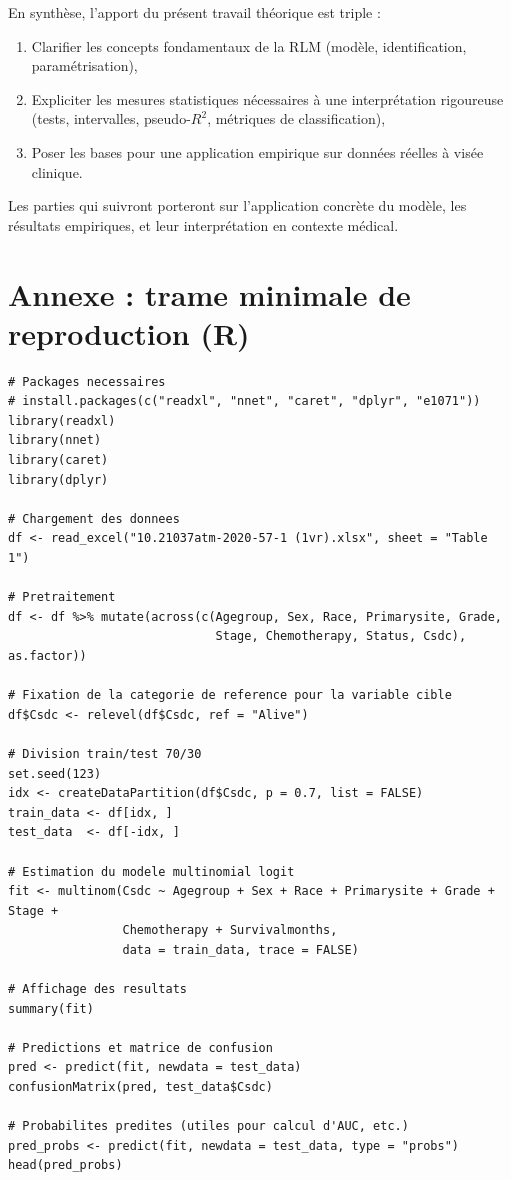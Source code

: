 \documentclass[12pt,a4paper]{article}
\begin{document}
En synthèse, l'apport du présent travail théorique est triple :
\begin{enumerate}[label=\arabic*.]
    \item Clarifier les concepts fondamentaux de la RLM (modèle, identification, paramétrisation),
    \item Expliciter les mesures statistiques nécessaires à une interprétation rigoureuse (tests, intervalles, pseudo-$R^2$, métriques de classification),
    \item Poser les bases pour une application empirique sur données réelles à visée clinique.
\end{enumerate}

Les parties qui suivront porteront sur l'application concrète du modèle, les résultats empiriques, et leur interprétation en contexte médical.

\section*{Annexe : trame minimale de reproduction (R)}

\begin{verbatim}
# Packages necessaires
# install.packages(c("readxl", "nnet", "caret", "dplyr", "e1071"))
library(readxl)
library(nnet)
library(caret)
library(dplyr)

# Chargement des donnees
df <- read_excel("10.21037atm-2020-57-1 (1vr).xlsx", sheet = "Table 1")

# Pretraitement
df <- df %>% mutate(across(c(Agegroup, Sex, Race, Primarysite, Grade,
                             Stage, Chemotherapy, Status, Csdc), as.factor))

# Fixation de la categorie de reference pour la variable cible
df$Csdc <- relevel(df$Csdc, ref = "Alive")

# Division train/test 70/30
set.seed(123)
idx <- createDataPartition(df$Csdc, p = 0.7, list = FALSE)
train_data <- df[idx, ]
test_data  <- df[-idx, ]

# Estimation du modele multinomial logit
fit <- multinom(Csdc ~ Agegroup + Sex + Race + Primarysite + Grade + Stage +
                Chemotherapy + Survivalmonths,
                data = train_data, trace = FALSE)

# Affichage des resultats
summary(fit)

# Predictions et matrice de confusion
pred <- predict(fit, newdata = test_data)
confusionMatrix(pred, test_data$Csdc)

# Probabilites predites (utiles pour calcul d'AUC, etc.)
pred_probs <- predict(fit, newdata = test_data, type = "probs")
head(pred_probs)
\end{verbatim}
\end{document}
